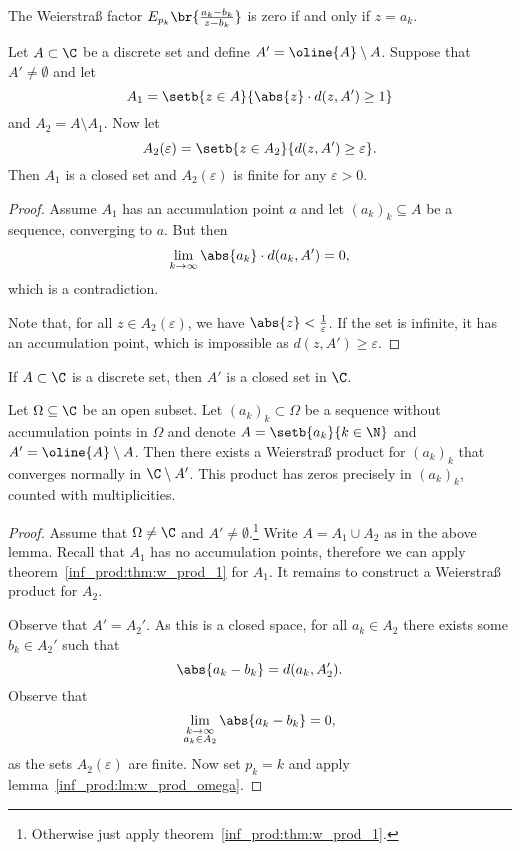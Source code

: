 \begin{opomba}
The Weierstraß factor $E_{p_k} \br{\frac{a_k - b_k}{z - b_k}}$ is
zero if and only if $z = a_k$.
\end{opomba}

\begin{lema}
\label{inf_prod:lm:divideA}
Let $A \subset \C$ be a discrete set and define
$A' = \oline{A} \setminus A$. Suppose that $A' \ne \emptyset$ and
let
\[
A_1 = \setb{z \in A}{\abs{z} \cdot d(z, A') \geq 1}
\]
and $A_2 = A \setminus A_1$. Now let
\[
A_2(\varepsilon) = \setb{z \in A_2}{d(z, A') \geq \varepsilon}.
\]
Then $A_1$ is a closed set and $A_2(\varepsilon)$ is finite for any
$\varepsilon > 0$.
\end{lema}

\begin{proof}
Assume $A_1$ has an accumulation point $a$ and let
$(a_k)_k \subseteq A$ be a sequence, converging to $a$. But then
\[
\lim_{k \to \infty} \abs{a_k} \cdot d(a_k, A') = 0,
\]
which is a contradiction.

Note that, for all $z \in A_2(\varepsilon)$, we have
$\abs{z} < \frac{1}{\varepsilon}$. If the set is infinite, it has
an accumulation point, which is impossible as
$d(z, A') \geq \varepsilon$.
\end{proof}

\begin{opomba}
If $A \subset \C$ is a discrete set, then $A'$ is a closed set in
$\C$.
\end{opomba}


\begin{izrek}
Let $\Omega \subseteq \C$ be an open subset. Let
$(a_k)_k \subset \Omega$ be a sequence without accumulation points
in $\Omega$ and denote $A = \setb{a_k}{k \in \N}$ and
$A' = \oline{A} \setminus A$. Then there exists a Weierstraß
product for $(a_k)_k$ that converges normally in $\C \setminus A'$.
This product has zeros precisely in $(a_k)_k$, counted with
multiplicities.
\end{izrek}

\begin{proof}
Assume that $\Omega \ne \C$ and
$A' \ne \emptyset$.\footnote{Otherwise just apply
theorem~\ref{inf_prod:thm:w_prod_1}.} Write $A = A_1 \cup A_2$ as
in the above lemma. Recall that $A_1$ has no accumulation points,
therefore we can apply theorem~\ref{inf_prod:thm:w_prod_1} for
$A_1$. It remains to construct a Weierstraß product for $A_2$.

Observe that $A' = A_2'$. As this is a closed space, for all
$a_k \in A_2$ there exists some $b_k \in A_2'$ such that
\[
\abs{a_k - b_k} = d(a_k, A_2').
\]
Observe that
\[
\lim_{\substack{k \to \infty \\ a_k \in A_2}} \abs{a_k - b_k} = 0,
\]
as the sets $A_2(\varepsilon)$ are finite. Now set $p_k = k$ and
apply lemma~\ref{inf_prod:lm:w_prod_omega}.
\end{proof}


